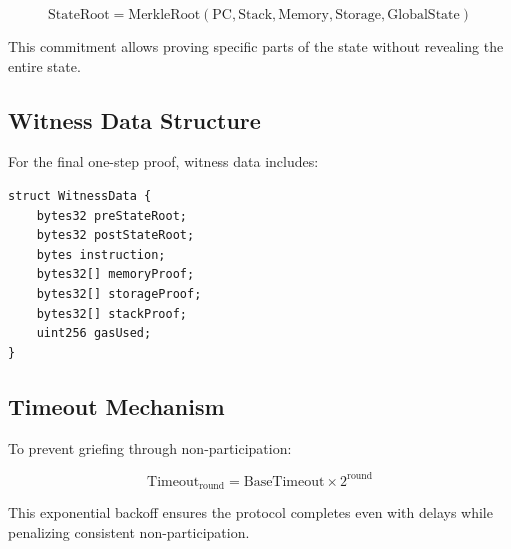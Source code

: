 \begin{equation}
\text{StateRoot} = \text{MerkleRoot}(\text{PC}, \text{Stack}, \text{Memory}, \text{Storage}, \text{GlobalState})
\end{equation}

This commitment allows proving specific parts of the state without revealing the entire state.

\subsection{Witness Data Structure}

For the final one-step proof, witness data includes:

\begin{lstlisting}[language=Solidity, caption=Witness Data Structure]
struct WitnessData {
    bytes32 preStateRoot;
    bytes32 postStateRoot;
    bytes instruction;
    bytes32[] memoryProof;
    bytes32[] storageProof;
    bytes32[] stackProof;
    uint256 gasUsed;
}
\end{lstlisting}

\subsection{Timeout Mechanism}

To prevent griefing through non-participation:

\begin{equation}
\text{Timeout}_{\text{round}} = \text{BaseTimeout} \times 2^{\text{round}}
\end{equation}

This exponential backoff ensures the protocol completes even with delays while penalizing consistent non-participation.

